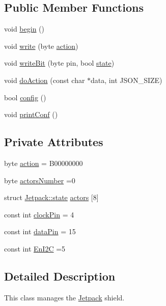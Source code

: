 \subsection*{Public Member Functions}
\begin{DoxyCompactItemize}
\item 
void \hyperlink{classJetpack_a5a53e1ebf7aaf3bf3e0d37ea64ca09a7}{begin} ()
\item 
void \hyperlink{classJetpack_a338f1af8cbc6504ac69b47c7328569b5}{write} (byte \hyperlink{classJetpack_aca3142925a7b0834b34ae91d26af7765}{action})
\item 
void \hyperlink{classJetpack_a79ae7bc3c1828a0551a7c005c4f8bd00}{write\+Bit} (byte pin, bool \hyperlink{structJetpack_1_1state}{state})
\item 
void \hyperlink{classJetpack_a86d2e83436ef4b85f4c3a6e85ac785b0}{do\+Action} (const char $\ast$data, int J\+S\+O\+N\+\_\+\+S\+I\+ZE)
\item 
bool \hyperlink{classJetpack_ab065ee83e244265a2223a22f3ee4a719}{config} ()
\item 
void \hyperlink{classJetpack_ac54a7bb4f9166bee32052253d9b1d306}{print\+Conf} ()
\end{DoxyCompactItemize}
\subsection*{Private Attributes}
\begin{DoxyCompactItemize}
\item 
byte \hyperlink{classJetpack_aca3142925a7b0834b34ae91d26af7765}{action} = B00000000
\item 
byte \hyperlink{classJetpack_a52c86319cb3f7f1ab744a64db18a7ba5}{actors\+Number} =0
\item 
struct \hyperlink{structJetpack_1_1state}{Jetpack\+::state} \hyperlink{classJetpack_a7e16d2f97837f9712a2e6de1c50d99db}{actors} \mbox{[}8\mbox{]}
\item 
const int \hyperlink{classJetpack_a58ebb991f358f3ae94e82148b0221b5a}{clock\+Pin} = 4
\item 
const int \hyperlink{classJetpack_a3d669a56e93c71dd25f970d4ed7d0c00}{data\+Pin} = 15
\item 
const int \hyperlink{classJetpack_a81df984fb4cea98c71aa1a1cfcdfe814}{En\+I2C} =5
\end{DoxyCompactItemize}


\subsection{Detailed Description}
This class manages the \hyperlink{classJetpack}{Jetpack} shield. 

